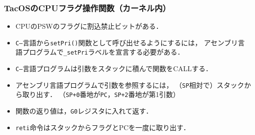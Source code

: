 \documentclass[unicode]{beamer}                   %
\begin{document}
\begin{frame}
  \frametitle{TacOSのCPUフラグ操作関数（カーネル内）}
  \begin{itemize}
  \item CPUのPSWのフラグに割込禁止ビットがある．
  \item {\tt C--}言語から{\tt setPri()}関数として呼び出せるようにするには，
    アセンブリ言語プログラムで{\tt \_setPri}ラベルを宣言する必要がある．
  \item {\tt C--}言語プログラムは引数をスタックに積んで関数をCALLする．
  \item アセンブリ言語プログラムで引数を参照するには，
    （{\tt SP}相対で）スタックから取り出す．
    （{\tt SP+0}番地が{\tt PC}，{\tt SP+2}番地が第1引数）
  \item 関数の返り値は，{\tt G0}レジスタに入れて返す．
  \item {\tt reti}命令はスタックからフラグとPCを一度に取り出す．
  \end{itemize}
\end{frame}
\end{document}
